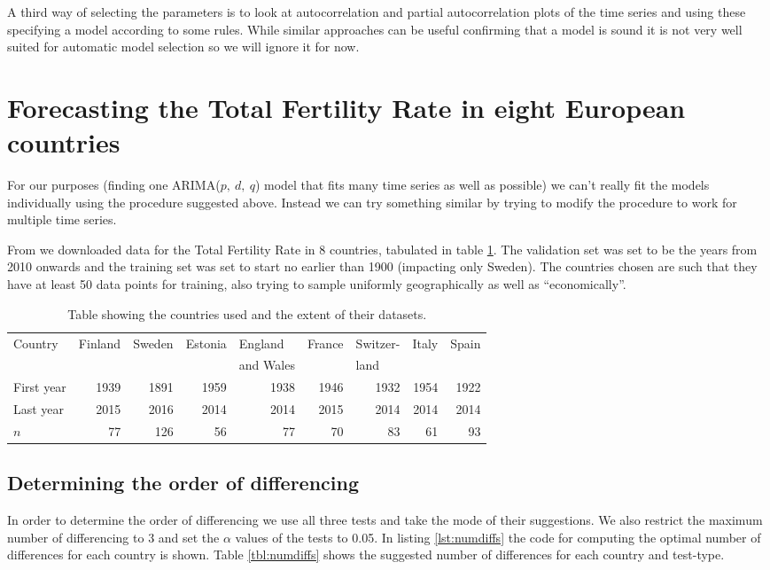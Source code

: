 \documentclass[a4paper, 12pt]{scrartcl}
\begin{document}
A third way of selecting the parameters is to look at autocorrelation and partial autocorrelation plots of the time series and using these specifying a model according to some rules.
While similar approaches can be useful confirming that a model is sound it is not very well suited for automatic model selection so we will ignore it for now.

\section{Forecasting the Total Fertility Rate in eight European countries}
For our purposes (finding one ARIMA($p,~d,~q$) model that fits many time series as well as possible) we can't really fit the models individually using the procedure suggested above.
Instead we can try something similar by trying to modify the procedure to work for multiple time series.

From \cite{web:TFR} we downloaded data for the Total Fertility Rate in 8 countries, tabulated in table \ref{tbl:countries}.
The validation set was set to be the years from 2010 onwards and the training set was set to start no earlier than 1900 (impacting only Sweden).
The countries chosen are such that they have at least 50 data points for training, also trying to sample uniformly geographically as well as ``economically''.
\begin{table}
	\centering
	\label{tbl:countries}
	\begin{tabular}{l | r r r r r r r r}
		Country & \multicolumn{1}{l}{Finland} & \multicolumn{1}{l}{Sweden} & \multicolumn{1}{l}{Estonia} & \multicolumn{1}{l}{England} & \multicolumn{1}{l}{France} & \multicolumn{1}{l}{Switzer-} & \multicolumn{1}{l}{Italy} & \multicolumn{1}{l}{Spain}\\
		& & & & \multicolumn{1}{l}{and Wales} & & \multicolumn{1}{l}{land} & & \\
		\hline
		First year & 1939 & 1891 & 1959 & 1938 & 1946 & 1932 & 1954 & 1922\\
		Last year & 2015 & 2016 & 2014 & 2014 & 2015 & 2014 & 2014 & 2014\\
		$n$ & 77 & 126 & 56 & 77 & 70 & 83 & 61 & 93
	\end{tabular}
		\caption{Table showing the countries used and the extent of their datasets.}
\end{table}

\subsection{Determining the order of differencing}
In order to determine the order of differencing we use all three tests and take the mode of their suggestions.
We also restrict the maximum number of differencing to 3 and set the $\alpha$ values of the tests to 0.05.
In listing \ref{lst:numdiffs} the code for computing the optimal number of differences for each country is shown.
Table \ref{tbl:numdiffs} shows the suggested number of differences for each country and test-type.
\end{document}
